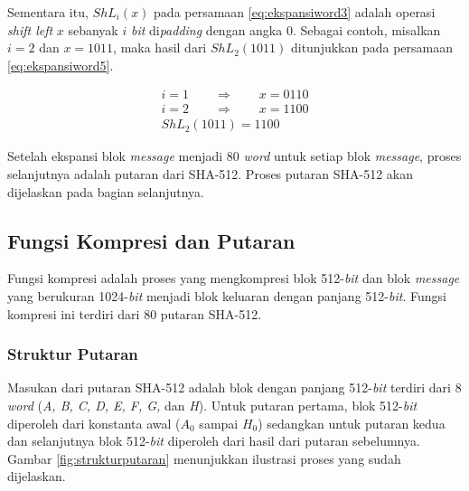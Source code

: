 Sementara itu, \begin{math}ShL_i(x)\end{math} pada persamaan \ref{eq:ekspansiword3} adalah operasi \textit{shift left} \begin{math}x\end{math} sebanyak \begin{math}i\end{math} \textit{bit} di\textit{padding} dengan angka 0. Sebagai contoh, misalkan \begin{math}i=2\end{math} dan \begin{math}x=1011\end{math}, maka hasil dari \begin{math}ShL_2(1011)\end{math} ditunjukkan pada persamaan \ref{eq:ekspansiword5}.

\begin{align}
	i = 1 \qquad\Rightarrow\qquad x = 0110 \nonumber \\
	i = 2 \qquad\Rightarrow\qquad x = 1100 \label{eq:ekspansiword5} \\
	ShL_2(1011) = 1100 \nonumber
\end{align}

Setelah ekspansi blok \textit{message} menjadi 80 \textit{word} untuk setiap blok \textit{message}, proses selanjutnya adalah putaran dari SHA-512. Proses putaran SHA-512 akan dijelaskan pada bagian selanjutnya.

\subsection{Fungsi Kompresi dan Putaran}\label{subsec:putaransha}

Fungsi kompresi adalah proses yang mengkompresi blok 512-\textit{bit} dan blok \textit{message} yang berukuran 1024-\textit{bit} menjadi blok keluaran dengan panjang 512-\textit{bit}. Fungsi kompresi ini terdiri dari 80 putaran SHA-512. 

\subsubsection{Struktur Putaran}

Masukan dari putaran SHA-512 adalah blok dengan panjang 512-\textit{bit} terdiri dari 8 \textit{word} (\textit{A, B, C, D, E, F, G,} dan \textit{H}). Untuk putaran pertama, blok 512-\textit{bit} diperoleh dari konstanta awal (\begin{math}A_0\end{math} sampai \begin{math}H_0\end{math}) sedangkan untuk putaran kedua dan selanjutnya blok 512-\textit{bit} diperoleh dari hasil dari putaran sebelumnya. Gambar \ref{fig:strukturputaran} menunjukkan ilustrasi proses yang sudah dijelaskan.

